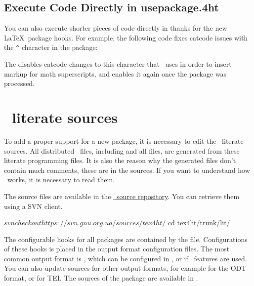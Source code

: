 \subsection{Execute Code Directly in usepackage.4ht}

You can also execute shorter pieces of code directly in  thanks for the new 
\LaTeX\ package hooks. For example, the following code fixes catcode issues with the \verb|^| character
in the  package:

\begin{texsource}
\end{texsource}

The  disables catcode changes to this character that \texfourht\ uses in order
to insert markup for math superscripts, and  enables it again once the package
was processed.

\section{\texfourht\ literate sources}

To add a proper support for a new package, it is necessary to edit the 
\texfourht\ literate sources. All distributed \texfourht\ files, including
 and all  files, are generated from these literate
programming files. It is also the reason why the generated files don't contain
much comments, these are in the sources. If you want to understand
how \texfourht\ works, it is necessary to read them.

The source files are available in the \href{https://puszcza.gnu.org.ua/projects/tex4ht/}{\texfourht\ source repository}.
You can retrieve them using a SVN client. 

\begin{shellcommand}
$ svn checkout https://svn.gnu.org.ua/sources/tex4ht/
$ cd tex4ht/trunk/lit/
\end{shellcommand}


The configurable hooks for all packages are contained by the  file.
Configurations of these hooks is placed in the output format configuration files.
The most common output format is \HTML, which can be configured in , or 
 if \HTMLV\ features are used. You can also update sources for other output
formats, for example  for the ODT format, or  for TEI.
The sources of the  package are available in .

